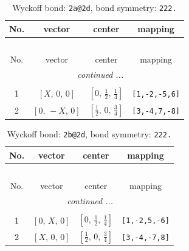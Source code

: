 \documentclass[fleqn,8pt]{jsarticle}
\begin{document}
\begin{longtable}{cccc}
\caption{Wyckoff bond: {\tt 2a@2d}, bond symmetry: {\tt 222.}}
 \\
 \hline \hline
No. & vector & center & mapping \\ \hline \endfirsthead

\multicolumn{3}{l}{\tablename\ \thetable{}} \\
 \hline \hline
No. & vector & center & mapping \\ \hline \endhead

 \hline \hline
\multicolumn{3}{r}{\footnotesize\it continued ...} \\ \endfoot

 \hline \hline
\multicolumn{3}{r}{} \\ \endlastfoot

1 & $\left[ X,\, 0,\, 0 \right]$ & $\left[ 0,\, \frac{1}{2},\, \frac{1}{4} \right]$ & {\tt [1,-2,-5,6]} \\ \hline
2 & $\left[ 0,\, - X,\, 0 \right]$ & $\left[ \frac{1}{2},\, 0,\, \frac{3}{4} \right]$ & {\tt [3,-4,7,-8]} \\
\end{longtable}
\renewcommand{\arraystretch}{1.2}
\begin{longtable}{cccc}
\caption{Wyckoff bond: {\tt 2b@2d}, bond symmetry: {\tt 222.}}
 \\
 \hline \hline
No. & vector & center & mapping \\ \hline \endfirsthead

\multicolumn{3}{l}{\tablename\ \thetable{}} \\
 \hline \hline
No. & vector & center & mapping \\ \hline \endhead

 \hline \hline
\multicolumn{3}{r}{\footnotesize\it continued ...} \\ \endfoot

 \hline \hline
\multicolumn{3}{r}{} \\ \endlastfoot

1 & $\left[ 0,\, X,\, 0 \right]$ & $\left[ 0,\, \frac{1}{2},\, \frac{1}{4} \right]$ & {\tt [1,-2,5,-6]} \\ \hline
2 & $\left[ X,\, 0,\, 0 \right]$ & $\left[ \frac{1}{2},\, 0,\, \frac{3}{4} \right]$ & {\tt [3,-4,-7,8]} \\
\end{longtable}
\renewcommand{\arraystretch}{1.2}
\end{document}
